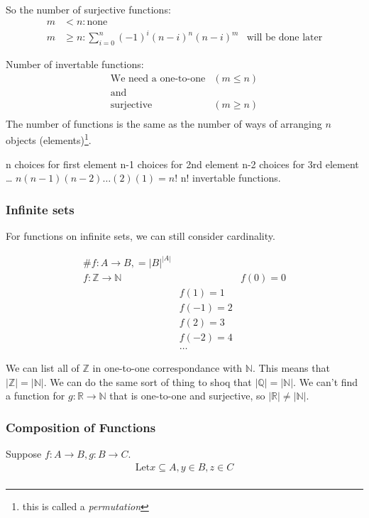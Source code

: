 So the number of surjective functions:
\begin{align}
  m & < n: \text{none} & \\
  m & \geq n: \sum_{i=0}^{n}(-1)^{i}(n-i)^{n}(n-i)^{m} & \text{will be done later}
\end{align}

Number of invertable functions:
\begin{align}
  \text{We need a one-to-one} & (m \leq n )\\
  \text{and} & \nonumber \\
  \text{surjective} & (m \geq n) \\
\end{align}
The number of functions is the same as the number of ways of arranging $n$ objects
(elements)\footnote{this is called a \emph{permutation}}.

n choices for first element
n-1 choices for 2nd element
n-2 choices for 3rd element
\ldots
$n(n-1)(n-2)\ldots(2)(1) = n!$
n! invertable functions.

\subsubsection{Infinite sets}
For functions on infinite sets, we can still consider cardinality.

\begin{align}
  \# f: A \to B, = |B|^{|A|} \\
  f: \mathbb{Z} \to \mathbb{N} &
   & f(0) = 0 \\
   & f(1) = 1 \\
   & f(-1) = 2 \\
   & f(2) = 3 \\
   & f(-2) = 4 \\
   & \ldots
\end{align}

We can list all of $\mathbb{Z}$ in one-to-one correspondance with $\mathbb{N}$.
This means that $|\mathbb{Z}| = |\mathbb{N}|$. We can do the same sort of thing
to shoq that $|\mathbb{Q}| = |\mathbb{N}|$. We can't find a function for
$g: \mathbb{R} \to \mathbb{N}$ that is one-to-one and surjective, so
$|\mathbb{R}| \neq |\mathbb{N}|$.

\subsubsection{Composition of Functions}
Suppose $f: A \to B, g: B \to C$. \\
\begin{align}
  \text{Let} x \subseteq A, y \in B, z \in C \\
\end{align}


